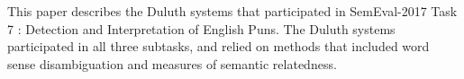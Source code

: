 This paper describes the Duluth systems that participated in SemEval-2017 Task 7 : Detection and Interpretation of English Puns. The Duluth systems participated in all three subtasks, and relied on methods that included word sense disambiguation and measures of semantic relatedness.
